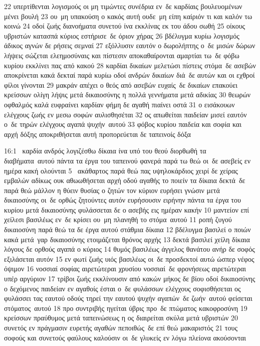 \documentclass[10pt,oneside,footinclude=true,headinclude=true]{scrbook} %
\begin{document}
22 υπερτίθενται λογισμούς οι μη τιμώντες συνέδρια εν δε καρδίαις βουλευομένων μένει βουλή
23 ου μη υπακούση ο κακός αυτή ουδε μη είπη καίριόν τι και καλόν τω κοινώ
24 οδοί ζωής διανοήματα συνετού ίνα εκκλίνας εκ του άδου σωθή
25 οίκους υβριστών κατασπά κύριος εστήρισε δε όριον χήρας
26 βδέλυγμα κυρίω λογισμός άδικος αγνών δε ρήσεις σεμναί
27 εξόλλυσιν εαυτόν ο δωρολήπτης ο δε μισών δώρων λήψεις σώζεται ελεημοσύναις και πίστεσιν αποκαθαίρονται αμαρτίαι τω δε φόβω κυρίου εκκλίνει πας από κακού
28 καρδίαι δικαίων μελετώσι πίστεις στόμα δε ασεβών αποκρίνεται κακά δεκταί παρά κυρίω οδοί ανδρών δικαίων διά δε αυτών και οι εχθροί φίλοι γίνονται
29 μακράν απέχει ο θεός από ασεβών ευχαίς δε δικαίων επακούει κρείσσων ολίγη λήψις μετά δικαιοσύνης η πολλά γεννήματα μετά αδικίας
30 θεωρών οφθαλμός καλά ευφραίνει καρδίαν φήμη δε αγαθή πιαίνει οστά
31 ο εισάκουων ελέγχους ζωής εν μεσω σοφών αυλισθησέται
32 ος απωθείται παιδείαν μισεί εαυτόν ο δε τηρών ελέγχους αγαπά ψυχήν αυτού
33 φόβος κυρίου παιδεία και σοφία και αρχή δόξης αποκριθήσεται αυτή προπορεύεται δε ταπεινοίς δόξα
\par
16:1  καρδία ανδρός λογιζέσθω δίκαια ίνα υπό του θεού διορθωθή τα διαβήματα αυτού πάντα τα έργα του ταπεινού φανερά παρά τω θεώ οι δε ασεβείς εν ημέρα κακή ολούνται
5  ακάθαρτος παρά θεώ πας υψηλοκάρδιος χειρί δε χείρας εμβαλών αδίκως ουκ αθωωθήσεται αρχή οδού αγαθής το ποιείν τα δίκαια δεκτά δε παρά θεώ μάλλον η θύειν θυσίας ο ζητών τον κύριον ευρήσει γνώσιν μετά δικαιοσύνης οι δε ορθώς ζητούντες αυτόν ευρήσουσιν ειρήνην πάντα τα έργα του κυρίου μετά δικαιοσύνης φυλάσσεται δε ο ασεβής εις ημέραν κακήν
10 μαντείον επί χείλεσι βασιλέως εν δε κρίσει ου μη πλανηθή το στόμα αυτού
11 ροπή ζυγού δικαιοσύνη παρά θεώ τα δε έργα αυτού στάθμια δίκαια
12 βδέλυγμα βασιλεί ο ποιών κακά μετά γαρ δικαιοσύνης ετοιμάζεται θρόνος αρχής
13 δεκτά βασιλεί χείλη δίκαια λόγους δε ορθούς αγαπά ο κύριος
14 θυμός βασιλέως άγγελος θανάτου ανήρ δε σοφός εξιλάσεται αυτόν
15 εν φωτί ζωής υιός βασιλέως οι δε προσδεκτοί αυτώ ώσπερ νέφος όψιμον
16 νοσσιαί σοφίας αιρετώτεραι χρυσίου νοσσιαί δε φρονήσεως αιρετώτεραι υπέρ αργύριον
17 τρίβοι ζωής εκκλίνουσιν από κακών μήκος δε βίου οδοί δικαιοσύνης ο δεχόμενος παιδείαν εν αγαθοίς έσται ο δε φυλάσσων ελέγχους σοφισθήσεται ος φυλάσσει τας εαυτού οδούς τηρεί την εαυτού ψυχήν αγαπών δε ζωήν αυτού φείσεται στόματος αυτού
18 προ συντριβής ηγείται ύβρις προ δε πτώματος κακοφροσύνη
19 κρείσσων πραύθυμος μετά ταπεινώσεως η ος διαιρείται σκύλα μετά υβριστών
20 συνετός εν πράγμασιν ευρετής αγαθών πεποιθώς δε επί θεώ μακαριστός
21 τους σοφούς και συνετούς φαύλους καλούσιν οι δε γλυκείς εν λόγω πλείονα ακούσονται
\end{document}
